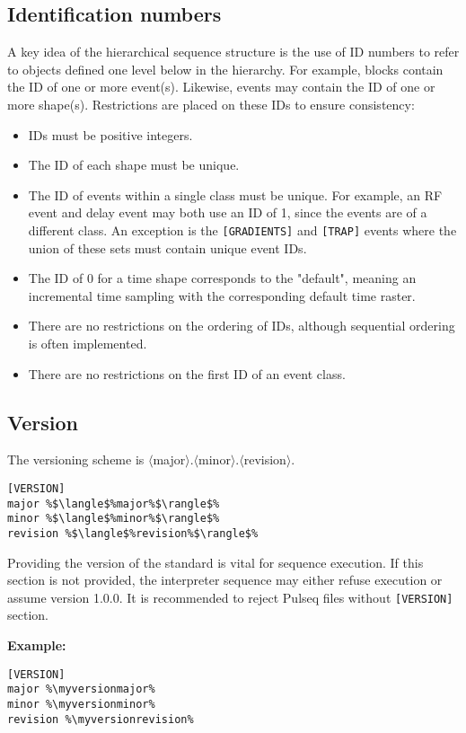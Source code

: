 \documentclass{article}
\def\myversionmajor{1}
\def\myversionminor{5}
\def\myversionrevision{0}
\begin{document}
\subsection{Identification numbers}
A key idea of the hierarchical sequence structure is the use of ID numbers to refer to objects defined one level below in the hierarchy. For example, blocks contain the ID of one or more event(s). Likewise, events may contain the ID of one or more shape(s). Restrictions are placed on these IDs to ensure consistency:
\begin{itemize}
\item IDs must be positive integers.
\item The ID of each shape must be unique.
\item The ID of events within a single class must be unique. For example, an RF event and delay event may both use an ID of 1, since the events are of a different class. An exception is the \verb.[GRADIENTS]. and \verb.[TRAP]. events where the union of these sets must contain unique event IDs.
\item The ID of 0 for a time shape corresponds to the "default", meaning an incremental time sampling with the corresponding default time raster.
\item There are no restrictions on the ordering of IDs, although sequential ordering is often implemented.
\item There are no restrictions on the first ID of an event class.
\end{itemize}

\subsection{Version}

The versioning scheme is $\langle$major$\rangle$.$\langle$minor$\rangle$.$\langle$revision$\rangle$.

\begin{lstlisting}[escapechar=\%]
[VERSION]
major %$\langle$%major%$\rangle$%
minor %$\langle$%minor%$\rangle$%
revision %$\langle$%revision%$\rangle$%
\end{lstlisting}

Providing the version of the standard is vital for sequence execution.
If this section is not provided, the interpreter sequence may either refuse execution or assume version 1.0.0. It is recommended to reject Pulseq files without \verb.[VERSION]. section.

\textbf{Example:}
\begin{lstlisting}[escapechar=\%]
[VERSION]
major %\myversionmajor%
minor %\myversionminor%
revision %\myversionrevision%
\end{lstlisting}
\end{document}
